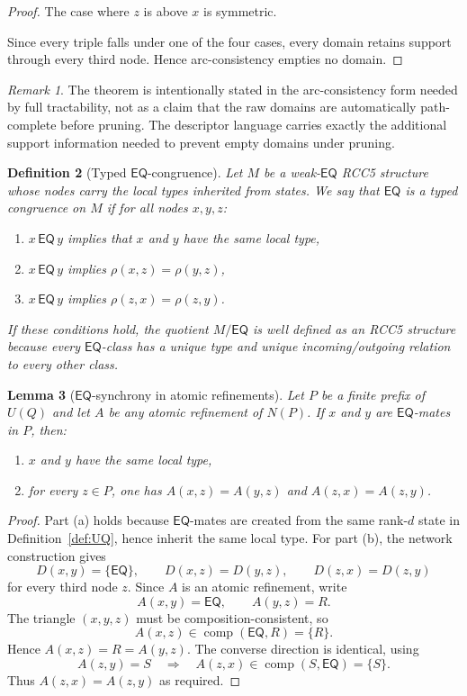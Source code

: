 \documentclass[11pt]{article}
\newtheorem{definition}{Definition}[section]
\newtheorem{lemma}[definition]{Lemma}
\theoremstyle{remark}
\newtheorem{remark}[definition]{Remark}
\newcommand{\EQ}{\mathsf{EQ}}
\newcommand{\comp}{\operatorname{comp}}
\begin{document}
\begin{proof}
The case where $z$ is above $x$ is symmetric.

Since every triple falls under one of the four cases, every domain retains support through every third node. Hence arc-consistency empties no domain.
\end{proof}

\begin{remark}
The theorem is intentionally stated in the arc-consistency form needed by full tractability, not as a claim that the raw domains are automatically path-complete before pruning. The descriptor language carries exactly the additional support information needed to prevent empty domains under pruning.
\end{remark}

\begin{definition}[Typed $\EQ$-congruence]\label{def:typed-congruence}
Let $M$ be a weak-$\EQ$ RCC5 structure whose nodes carry the local types inherited from states. We say that $\EQ$ is a \emph{typed congruence} on $M$ if for all nodes $x,y,z$:
\begin{enumerate}[label=(\roman*)]
    \item $x\,\EQ\,y$ implies that $x$ and $y$ have the same local type,
    \item $x\,\EQ\,y$ implies $\rho(x,z)=\rho(y,z)$,
    \item $x\,\EQ\,y$ implies $\rho(z,x)=\rho(z,y)$.
\end{enumerate}
If these conditions hold, the quotient $M/{\EQ}$ is well defined as an RCC5 structure because every $\EQ$-class has a unique type and unique incoming/outgoing relation to every other class.
\end{definition}

\begin{lemma}[$\EQ$-synchrony in atomic refinements]\label{lem:eq-synchrony}
Let $P$ be a finite prefix of $U(Q)$ and let $A$ be any atomic refinement of $N(P)$. If $x$ and $y$ are $\EQ$-mates in $P$, then:
\begin{enumerate}[label=(\alph*)]
    \item $x$ and $y$ have the same local type,
    \item for every $z\in P$, one has $A(x,z)=A(y,z)$ and $A(z,x)=A(z,y)$.
\end{enumerate}
\end{lemma}

\begin{proof}
Part (a) holds because $\EQ$-mates are created from the same rank-$d$ state in Definition~\ref{def:UQ}, hence inherit the same local type. For part (b), the network construction gives
\[
D(x,y)=\{\EQ\},\qquad D(x,z)=D(y,z),\qquad D(z,x)=D(z,y)
\]
for every third node $z$. Since $A$ is an atomic refinement, write
\[
A(x,y)=\EQ,\qquad A(y,z)=R.
\]
The triangle $(x,y,z)$ must be composition-consistent, so
\[
A(x,z)\in \comp(\EQ,R)=\{R\}.
\]
Hence $A(x,z)=R=A(y,z)$. The converse direction is identical, using
\[
A(z,y)=S\quad\Rightarrow\quad A(z,x)\in \comp(S,\EQ)=\{S\}.
\]
Thus $A(z,x)=A(z,y)$ as required.
\end{proof}
\end{document}
